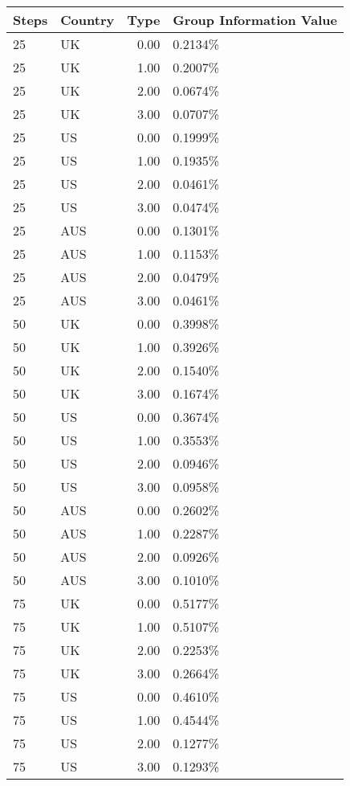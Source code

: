 \begin{table}[ht]
\centering
\begin{tabular}{llrl}
  \hline
Steps & Country & Type & Group Information Value \\ 
  \hline
25 & UK & 0.00 & 0.2134\% \\ 
  25 & UK & 1.00 & 0.2007\% \\ 
  25 & UK & 2.00 & 0.0674\% \\ 
  25 & UK & 3.00 & 0.0707\% \\ 
  25 & US & 0.00 & 0.1999\% \\ 
  25 & US & 1.00 & 0.1935\% \\ 
  25 & US & 2.00 & 0.0461\% \\ 
  25 & US & 3.00 & 0.0474\% \\ 
  25 & AUS & 0.00 & 0.1301\% \\ 
  25 & AUS & 1.00 & 0.1153\% \\ 
  25 & AUS & 2.00 & 0.0479\% \\ 
  25 & AUS & 3.00 & 0.0461\% \\ 
  50 & UK & 0.00 & 0.3998\% \\ 
  50 & UK & 1.00 & 0.3926\% \\ 
  50 & UK & 2.00 & 0.1540\% \\ 
  50 & UK & 3.00 & 0.1674\% \\ 
  50 & US & 0.00 & 0.3674\% \\ 
  50 & US & 1.00 & 0.3553\% \\ 
  50 & US & 2.00 & 0.0946\% \\ 
  50 & US & 3.00 & 0.0958\% \\ 
  50 & AUS & 0.00 & 0.2602\% \\ 
  50 & AUS & 1.00 & 0.2287\% \\ 
  50 & AUS & 2.00 & 0.0926\% \\ 
  50 & AUS & 3.00 & 0.1010\% \\ 
  75 & UK & 0.00 & 0.5177\% \\ 
  75 & UK & 1.00 & 0.5107\% \\ 
  75 & UK & 2.00 & 0.2253\% \\ 
  75 & UK & 3.00 & 0.2664\% \\ 
  75 & US & 0.00 & 0.4610\% \\ 
  75 & US & 1.00 & 0.4544\% \\ 
  75 & US & 2.00 & 0.1277\% \\ 
  75 & US & 3.00 & 0.1293\% \\ 

\end{tabular}
\end{table}
